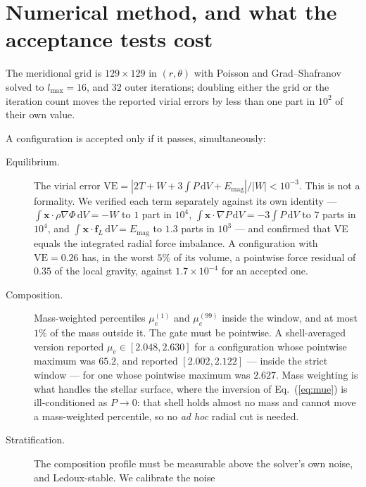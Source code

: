 \documentclass{aa}
\begin{document}

\section{Numerical method, and what the acceptance tests cost}
\label{sec:method}

The meridional grid is $129 \times 129$ in $(r,\theta)$ with Poisson and
Grad--Shafranov solved to $l_{\max} = 16$, and $32$ outer iterations;
doubling either the grid or the iteration count moves the reported
virial errors by less than one part in $10^{2}$ of their own value.

A configuration is accepted only if it passes, simultaneously:

\begin{description}
\item[Equilibrium.] The virial error
      $\mathrm{VE} = |2T + W + 3\!\int\!P\,\mathrm{d}V +
      E_{\mathrm{mag}}|/|W| < 10^{-3}$. This is not a formality. We
      verified each term separately against its own identity ---
      $\int \mathbf{x}\cdot\rho\nabla\Phi\,\mathrm{d}V = -W$ to
      $1$ part in $10^4$,
      $\int \mathbf{x}\cdot\nabla P\,\mathrm{d}V = -3\!\int\!P\,\mathrm{d}V$
      to $7$ parts in $10^4$, and
      $\int \mathbf{x}\cdot\mathbf{f}_L\,\mathrm{d}V = E_{\mathrm{mag}}$
      to $1.3$ parts in $10^3$ --- and confirmed that VE equals the
      integrated radial force imbalance. A configuration with
      $\mathrm{VE} = 0.26$ has, in the worst $5\%$ of its volume, a
      pointwise force residual of $0.35$ of the local gravity, against
      $1.7\times10^{-4}$ for an accepted one.
\item[Composition.] Mass-weighted percentiles $\mu_e^{(1)}$ and
      $\mu_e^{(99)}$ inside the window, and at most $1\%$ of the mass
      outside it. The gate must be pointwise. A shell-averaged version
      reported $\mu_e \in [2.048, 2.630]$ for a configuration whose
      pointwise maximum was $65.2$, and reported $[2.002, 2.122]$ ---
      inside the strict window --- for one whose pointwise maximum was
      $2.627$. Mass weighting is what handles the stellar surface, where
      the inversion of Eq.~(\ref{eq:mue}) is ill-conditioned as
      $P \to 0$: that shell holds almost no mass and cannot move a
      mass-weighted percentile, so no \textit{ad hoc} radial cut is
      needed.
\item[Stratification.] The composition profile must be measurable above
      the solver's own noise, and Ledoux-stable. We calibrate the noise

\end{description}
\end{document}
